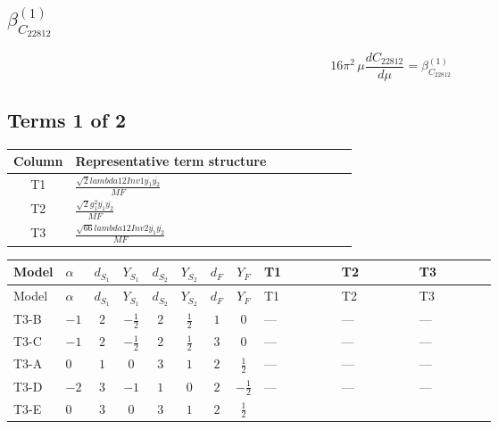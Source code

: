 \documentclass[8pt]{article}
\begin{document}
\begin{landscape}
\section*{$\beta_{C_{22812}}^{(1)}$}
\[16\pi^2\,\mu\frac{d C_{22812}}{d\mu}=\beta_{C_{22812}}^{(1)}\]
\subsection*{Terms 1 of 2}
\begin{center}
\begin{tabular}{@{}c >{\raggedright\arraybackslash}p{0.82\linewidth}@{}}
\toprule
Column & Representative term structure \\
\midrule
T1 & \(\displaystyle \frac{\sqrt{2} lambda12Inv1 \overline{y_{1}} \overline{y_{2}}}{MF}\) \\
\midrule
T2 & \(\displaystyle \frac{\sqrt{2} g_{1}^{2} \overline{y_{1}} \overline{y_{2}}}{MF}\) \\
\midrule
T3 & \(\displaystyle \frac{\sqrt{66} lambda12Inv2 \overline{y_{1}} \overline{y_{2}}}{MF}\) \\
\midrule
\bottomrule
\end{tabular}
\end{center}
\smallskip
\tiny
\begin{longtable}{@{}llcccccc >{\raggedright\arraybackslash}p{0.21\linewidth} >{\raggedright\arraybackslash}p{0.21\linewidth} >{\raggedright\arraybackslash}p{0.21\linewidth}@{}}
\toprule
Model & $\alpha$ & $d_{S_1}$ & $Y_{S_1}$ & $d_{S_2}$ & $Y_{S_2}$ & $d_F$ & $Y_F$ & T1 & T2 & T3 \\
\midrule
\endfirsthead
\toprule
Model & $\alpha$ & $d_{S_1}$ & $Y_{S_1}$ & $d_{S_2}$ & $Y_{S_2}$ & $d_F$ & $Y_F$ & T1 & T2 & T3 \\
\midrule
\endhead
T3-B & $-1$ & $2$ & $-\frac{1}{2}$ & $2$ & $\frac{1}{2}$ & $1$ & $0$ & --- & --- & --- \\
\midrule
T3-C & $-1$ & $2$ & $-\frac{1}{2}$ & $2$ & $\frac{1}{2}$ & $3$ & $0$ & --- & --- & --- \\
\midrule
T3-A & $0$ & $1$ & $0$ & $3$ & $1$ & $2$ & $\frac{1}{2}$ & --- & --- & --- \\
\midrule
T3-D & $-2$ & $3$ & $-1$ & $1$ & $0$ & $2$ & $-\frac{1}{2}$ & --- & --- & --- \\
\midrule
T3-E & $0$ & $3$ & $0$ & $3$ & $1$ & $2$ & $\frac{1}{2}$ & \scriptsize\adjustbox{max width=\linewidth}{$\begin{gathered} - \frac{\sqrt{2} lambda12Inv1 \overline{y_{1}} \overline{y_{2}}}{4 MF}\end{gathered}$} & \scriptsize\adjustbox{max width=\linewidth}{$\begin{gathered} \frac{3 \sqrt{2} g_{1}^{2} \overline{y_{1}} \overline{y_{2}}}{16 MF}\end{gathered}$} & \scriptsize\adjustbox{max width=\linewidth}{$\begin{gathered} \frac{3 \sqrt{66} lambda12Inv2 \overline{y_{1}} \overline{y_{2}}}{44 MF}\end{gathered}$} \\
\midrule
\bottomrule
\end{longtable}
\clearpage

\end{landscape}
\end{document}

